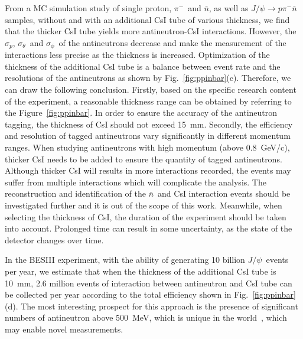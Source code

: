 \documentclass[aps,preprint,showkeys,superscriptaddress]{revtex4}
\newcommand{\chinese}[1]{\begin{CJK}{UTF8}{gbsn}#1\end{CJK}}
\newcommand{\red}[1]{\textcolor{red}{#1}}
\newcommand{\pim}{$\pi^-$}
\newcommand{\nbar}{$\bar{n}$}
\newcommand{\jpsi}{$J/\psi$}
\newcommand{\pres}{$\sigma_p$}
\newcommand{\tres}{$\sigma_\theta$}
\newcommand{\phires}{$\sigma_\phi$}
\newcommand{\tbd}{\red{[tbd]}\ }
\begin{document}
From a MC simulation study of single proton, \pim\, and \nbar, as well as
$J/\psi\to p \pi^- \bar{n}$ samples, without and with an additional CsI tube of
various thickness, we find that the thicker CsI tube yields more antineutron-CsI 
interactions. However, the \pres, \tres\ and \phires\ of the antineutrons 
decrease and make the measurement of the interactions less precise as the 
thickness is increased. Optimization of the thickness of the
additional CsI tube is a balance between event rate and the resolutions of
the antineutrons as shown by Fig.~\ref{fig:ppinbar}(c). Therefore, we can draw the
following conclusion. Firstly, based on the specific research content of the
experiment, a reasonable thickness range can be obtained by referring to the
Figure~\ref{fig:ppinbar}. In order to ensure the accuracy of the
antineutron tagging, the thickness of CsI should not exceed 15~mm. Secondly,
the efficiency and resolution of tagged antineutrons vary significantly in
different momentum ranges. When studying antineutrons with high momentum (above
0.8~GeV/c), thicker CsI needs to be added to ensure the quantity of tagged
antineutrons. Although thicker CsI will results in more interactions recorded,
the events may suffer from multiple interactions which will complicate the analysis. 
The reconstruction and identification of the \nbar\ and CsI interaction events 
should be investigated further and it is out of the scope of
this work. Meanwhile, when selecting the thickness of CsI, the duration of the
experiment should be taken into account. Prolonged time can result in some
uncertainty, as the state of the detector changes over time.

In the BESIII experiment, with the ability of generating 10 billion \jpsi\ events
per year, we estimate that when the thickness of the additional CsI tube is
10~mm, 2.6 million events of interaction between antineutron and CsI tube can
be collected per year according to the total efficiency shown in Fig.~\ref{fig:ppinbar}(d). 
The most interesting prospect for this approach is the presence of significant numbers  
of antineutron above 500~MeV, which is unique in the world~\cite{hypronProjectileFromJpsi}, 
which may enable novel measurements.
    
    
\end{document}
